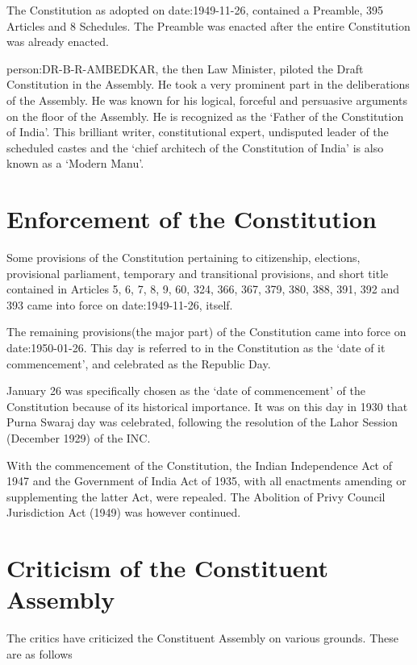 { The Constitution as adopted on \gls{date:1949-11-26}, contained a Preamble, 395 Articles and 8 Schedules}. The Preamble was enacted after the entire Constitution was already enacted.

\gls{person:DR-B-R-AMBEDKAR}, the then Law Minister, piloted the Draft Constitution in the Assembly. He took a very prominent part in the deliberations of the Assembly. He was known for his logical, forceful and persuasive arguments on the floor of the Assembly. He is recognized as the `Father of the Constitution of India'. This brilliant writer, constitutional expert, undisputed leader of the scheduled castes and the `chief architech of the Constitution of India' is also known as a `Modern Manu'.

\section{Enforcement of the Constitution}

Some provisions of the Constitution pertaining to citizenship, elections, provisional parliament, temporary and transitional provisions, and short title contained in Articles 5, 6, 7, 8, 9, 60, 324, 366, 367, 379, 380, 388, 391, 392 and 393 came into force on \gls{date:1949-11-26}, itself.

The remaining provisions(the major part) of the Constitution came into force on \gls{date:1950-01-26}. This day is referred to in the Constitution as the `date of it commencement', and celebrated as the Republic Day.

January 26 was specifically chosen as the `date of commencement' of the Constitution because of its historical importance. It was on this day in 1930 that { Purna Swaraj} day was celebrated, following the resolution of the Lahor Session (December 1929) of the INC.

With the commencement of the Constitution, the Indian Independence Act of 1947 and the Government of India Act of 1935, with all enactments amending or supplementing the latter Act, were repealed. The Abolition of Privy Council Jurisdiction Act (1949) was however continued.

\section{Criticism of the Constituent Assembly}

The critics have criticized the Constituent Assembly on various grounds. These are as follows

